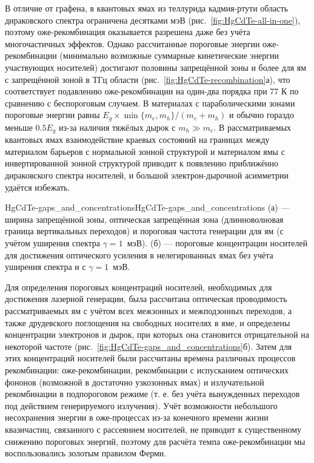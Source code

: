 В отличие от графена, в квантовых ямах из теллурида кадмия-ртути область дираковского спектра ограничена десятками мэВ (рис.~\ref{fig:HgCdTe-all-in-one}), поэтому оже-рекомбинация оказывается разрешена даже без учёта многочастичных эффектов. Однако рассчитанные пороговые энергии оже-рекомбинации (минимально возможные суммарные кинетические энергии участвующих носителей) достигают половины запрещённой зоны и более для ям с запрещённой зоной в ТГц области (рис.~\ref{fig:HgCdTe-recombination}а), что соответствует подавлению оже-рекомбинации на один-два порядка при 77 К по сравнению с беспороговым случаем. В материалах с параболическими зонами пороговые энергии равны $E_g \times \min\{m_e, m_h\}/(m_e + m_h)$ и обычно гораздо меньше $0.5 E_g$ из-за наличия тяжёлых дырок с $m_h \gg m_e$. В рассматриваемых квантовых ямах взаимодействие краевых состояний на границах между материалом барьеров с нормальной зонной структурой и материалом ямы с инвертированной зонной структурой приводит к появлению приближённо дираковского спектра носителей, и большой электрон-дырочной асимметрии удаётся избежать.

\begin{fig}{HgCdTe-gaps_and_concentrations}{HgCdTe-gaps_and_concentrations} (а) --- ширина запрещённой зоны, оптическая запрещённая зона (длинноволновая граница вертикальных переходов) и пороговая частота генерации для ям \HgCdTe{} (с учётом уширения спектра $\gamma = 1$~мэВ). (б) --- пороговые концентрации носителей для достижения оптического усиления в нелегированных ямах без учёта уширения спектра и с $\gamma = 1$~мэВ.
\end{fig}

Для определения пороговых концентраций носителей, необходимых для достижения лазерной генерации, была рассчитана оптическая проводимость рассматриваемых ям с учётом всех межзонных и межподзонных переходов, а также друдевского поглощения на свободных носителях в яме, и определены концентрации электронов и дырок, при которых она становится отрицательной на некоторой частоте (рис.~\ref{fig:HgCdTe-gaps_and_concentrations}б). Затем для этих концентраций носителей были рассчитаны времена различных процессов рекомбинации: оже-рекомбинации, рекомбинации с испусканием оптических фононов (возможной в достаточно узкозонных ямах) и излучательной рекомбинации в подпороговом режиме (т. е. без учёта вынужденных переходов под действием генерируемого излучения). Учёт возможности небольшого несохранения энергии в оже-процессах из-за конечного времени жизни квазичастиц, связанного с рассеянием носителей, не приводит к существенному снижению пороговых энергий, поэтому для расчёта темпа оже-рекомбинации мы воспользовались золотым правилом Ферми.

